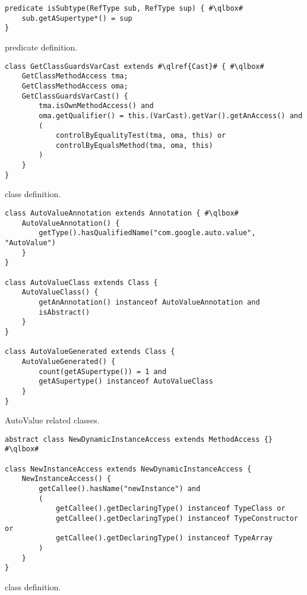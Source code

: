 \begin{listing}
\begin{verbatim}
predicate isSubtype(RefType sub, RefType sup) { #\qlbox#
	sub.getASupertype*() = sup
}
\end{verbatim}
\caption{ predicate definition.}
\label{lst:ql:isSubtype}
\end{listing}


\begin{listing}
\begin{verbatim}	
class GetClassGuardsVarCast extends #\qlref{Cast}# { #\qlbox#
	GetClassMethodAccess tma;
	GetClassMethodAccess oma;
	GetClassGuardsVarCast() {
		tma.isOwnMethodAccess() and
		oma.getQualifier() = this.(VarCast).getVar().getAnAccess() and
		(
			controlByEqualityTest(tma, oma, this) or
			controlByEqualsMethod(tma, oma, this)
		)
	}
}
\end{verbatim}
\caption{ class definition.}
\label{lst:ql:GetClassGuardsVarCast}
\end{listing}


\begin{listing}
\begin{verbatim}	
class AutoValueAnnotation extends Annotation { #\qlbox#
	AutoValueAnnotation() {
		getType().hasQualifiedName("com.google.auto.value", "AutoValue")
	}
}

class AutoValueClass extends Class {
	AutoValueClass() {
		getAnAnnotation() instanceof AutoValueAnnotation and
		isAbstract()
	}
}

class AutoValueGenerated extends Class {
	AutoValueGenerated() {
		count(getASupertype()) = 1 and
		getASupertype() instanceof AutoValueClass
	}
}
\end{verbatim}
\caption{AutoValue related \ql{} classes.}
\label{lst:ql:AutoValueGenerated}
\end{listing}


\begin{listing}
\begin{verbatim}
abstract class NewDynamicInstanceAccess extends MethodAccess {} #\qlbox#

class NewInstanceAccess extends NewDynamicInstanceAccess {
	NewInstanceAccess() {
		getCallee().hasName("newInstance") and
		(
			getCallee().getDeclaringType() instanceof TypeClass or
			getCallee().getDeclaringType() instanceof TypeConstructor or
			getCallee().getDeclaringType() instanceof TypeArray
		)
	}
}
\end{verbatim}
\caption{ class definition.}
\label{lst:ql:NewDynamicInstanceAccess}
\end{listing}


